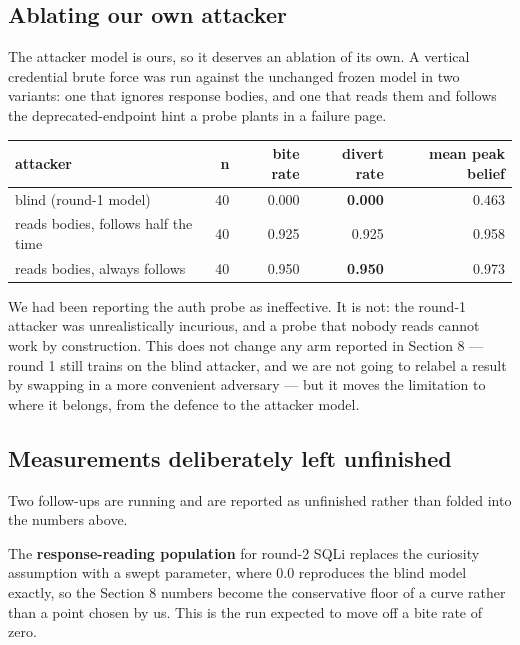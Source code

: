 \subsection{Ablating our own attacker}

The attacker model is ours, so it deserves an ablation of its own. A vertical
credential brute force was run against the unchanged frozen model in two variants:
one that ignores response bodies, and one that reads them and follows the
deprecated-endpoint hint a probe plants in a failure page.

\begin{table}[t]
\centering
\small
\begin{tabular}{lrrrr}
\toprule
attacker & n & bite rate & divert rate & mean peak belief \\
\midrule
blind (round-1 model) & 40 & 0.000 & \textbf{0.000} & 0.463 \\
reads bodies, follows half the time & 40 & 0.925 & 0.925 & 0.958 \\
reads bodies, always follows & 40 & 0.950 & \textbf{0.950} & 0.973 \\
\bottomrule
\end{tabular}
\end{table}


We had been reporting the auth probe as ineffective. It is not: the round-1
attacker was unrealistically incurious, and a probe that nobody reads cannot work
by construction. This does not change any arm reported in Section 8 --- round 1 still
trains on the blind attacker, and we are not going to relabel a result by swapping
in a more convenient adversary --- but it moves the limitation to where it belongs,
from the defence to the attacker model.


\subsection{Measurements deliberately left unfinished}

Two follow-ups are running and are reported as unfinished rather than folded into
the numbers above.

The \textbf{response-reading population} for round-2 SQLi replaces the curiosity
assumption with a swept parameter, where 0.0 reproduces the blind model exactly, so
the Section 8 numbers become the conservative floor of a curve rather than a point
chosen by us. This is the run expected to move  off a bite rate of
zero.

